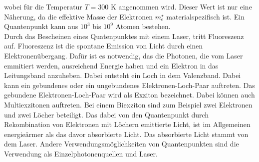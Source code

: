  wobei für die Temperatur $T=300$ K angenommen wird. Dieser Wert ist nur eine Näherung, da die effektive Masse der Elektronen $m_{\mathrm{e}}^\star$ materialspezifisch ist. Ein Quantenpunkt kann aus $10^3$ bis $10^9$ Atomen bestehen. \\
 Durch das Bescheinen eines Quatenpunktes mit einem Laser, tritt Fluoreszenz auf. Fluoreszenz ist die spontane Emission von Licht durch einen Elektronenübergang. Dafür ist es notwendig, das die Photonen, die vom Laser emmitiert werden, ausreichend  Energie haben und ein Elektron in das Leitungsband anzuheben. Dabei entsteht ein Loch in dem Valenzband. Dabei kann ein gebundenes oder ein ungebundenes Elektronen-Loch-Paar auftreten. 
 Das gebundene Elektronen-Loch-Paar wird als Exziton bezeichnet. Dabei können auch Multiexzitonen auftreten. Bei einem Biexziton sind zum Beispiel zwei Elektronen und zwei Löcher beteiligt. 
 Das dabei von den Quantenpunkt durch Rekombination von Elektronen mit Löchern emittierte Licht, ist im Allgemeinen energieärmer als das davor absorbierte Licht. Das absorbierte Licht stammt von dem Laser. 
 Andere Verwendungsmöglichkeiten von  Quantenpunkten sind die Verwendung als Einzelphotonenquellen und Laser. 

